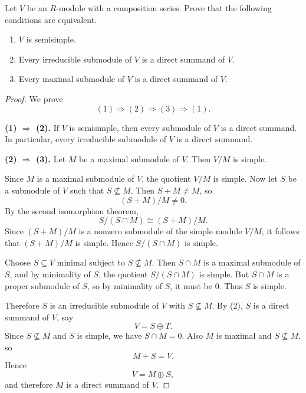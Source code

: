 \begin{exercise}
    Let \(V\) be an \(R\)-module with a composition series. Prove that the following conditions are equivalent.
    \begin{enumerate}
        \renewcommand{\labelenumi}{(\theenumi)}
        \item \(V\) is semisimple.
        \item Every irreducible submodule of \(V\) is a direct summand of \(V\).
        \item Every maximal submodule of \(V\) is a direct summand of \(V\).
    \end{enumerate}
\end{exercise}

\begin{proof}
    We prove
    \[
        (1)\Longrightarrow(2)\Longrightarrow(3)\Longrightarrow(1).
    \]

    \medskip
    \noindent\textbf{(1) \(\Longrightarrow\) (2).}
    If \(V\) is semisimple, then every submodule of \(V\) is a direct summand.
    In particular, every irreducible submodule of \(V\) is a direct summand.

    \medskip
    \noindent\textbf{(2) \(\Longrightarrow\) (3).}
    Let \(M\) be a maximal submodule of \(V\).
    Then \(V/M\) is simple.

    Since \(M\) is a maximal submodule of \(V\), the quotient \(V/M\) is simple.
    Now let \(S\) be a submodule of \(V\) such that \(S \nsubseteq M\).
    Then \(S+M \neq M\), so
    \[
        (S+M)/M \neq 0.
    \]
    By the second isomorphism theorem,
    \[
        S/(S\cap M)\cong (S+M)/M.
    \]
    Since \((S+M)/M\) is a nonzero submodule of the simple module \(V/M\), it follows that
    \((S+M)/M\) is simple. Hence \(S/(S\cap M)\) is simple.

    Choose \(S\subseteq V\) minimal subject to \(S\nsubseteq M\).
    Then \(S\cap M\) is a maximal submodule of \(S\), and by minimality of \(S\),
    the quotient \(S/(S\cap M)\) is simple.
    But \(S\cap M\) is a proper submodule of \(S\), so by minimality of \(S\), it must be \(0\).
    Thus \(S\) is simple.

    Therefore \(S\) is an irreducible submodule of \(V\) with \(S\nsubseteq M\).
    By (2), \(S\) is a direct summand of \(V\), say
    \[
        V=S\oplus T.
    \]
    Since \(S\nsubseteq M\) and \(S\) is simple, we have \(S\cap M=0\).
    Also \(M\) is maximal and \(S\not\subseteq M\), so
    \[
        M+S=V.
    \]
    Hence
    \[
        V=M\oplus S,
    \]
    and therefore \(M\) is a direct summand of \(V\).


\end{proof}
